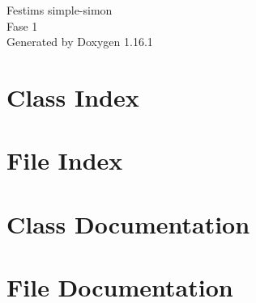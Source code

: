 \documentclass[twoside]{book}
\newcommand{\+}{\discretionary{\mbox{\scriptsize$\hookleftarrow$}}{}{}}
\newcommand{\clearemptydoublepage}{%
    \newpage{\pagestyle{empty}\cleardoublepage}%
  }
\begin{document}
  \raggedbottom
    \hypersetup{pageanchor=false,
                bookmarksnumbered=true,
                pdfencoding=unicode
               }
  \begin{titlepage}
  \vspace*{7cm}
  \begin{center}%
  {\Large Festim\textquotesingle{}s simple-\/simon}\\
  [1ex]\large Fase 1 \\
  \vspace*{1cm}
  {\large Generated by Doxygen 1.16.1}\\
  \end{center}
  \end{titlepage}
  \clearemptydoublepage
  \tableofcontents
  \clearemptydoublepage
  \hypersetup{pageanchor=true}

\chapter{Class Index}

\chapter{File Index}

\chapter{Class Documentation}










\chapter{File Documentation}








































  \backmatter
  \newpage
  \clearemptydoublepage
  \printindex
\end{document}
